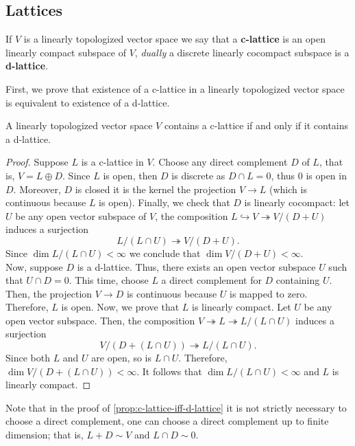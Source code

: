 \subsection*{Lattices}
\begin{definition}\label{def:c-lattice}
	If $V$ is a linearly topologized vector space we say that a \textbf{c-lattice} is an open linearly compact subspace of $V$, \textit{dually} a discrete linearly cocompact subspace is a \textbf{d-lattice}.
\end{definition}
First, we prove that existence of a c-lattice in a linearly topologized vector space is equivalent to existence of a d-lattice.
\begin{proposition}\label{prop:c-lattice-iff-d-lattice}
	A linearly topologized vector space $V$ contains a c-lattice if and only if it contains a d-lattice. 
\end{proposition}
\begin{proof}
	Suppose $L$ is a c-lattice in $V$. Choose any direct complement $D$ of $L$, that is, $V = L \oplus D$. Since $L$ is open, then $D$ is discrete as $D\cap L = 0$, thus ${0}$ is open in $D$. Moreover, $D$ is closed it is the kernel the projection $V \to L$ (which is continuous because $L$ is open). Finally, we check that $D$ is linearly cocompact: let $U$ be any open vector subspace of $V$, the composition $L \hookrightarrow V \twoheadrightarrow V/(D+U)$ induces a surjection 
	\[
		L/(L \cap U) \twoheadrightarrow V/(D+U).
	\]
	Since $\dim L / (L \cap U) < \infty$ we conclude that $\dim V/(D+U) < \infty$. \\
	Now, suppose $D$ is a d-lattice. Thus, there exists an open vector subspace $U$ such that $U \cap D = 0$. This time, choose $L$ a direct complement for $D$ containing $U$. Then, the projection $V \to D$ is continuous because $U$ is mapped to zero. Therefore, $L$ is open. Now, we prove that $L$ is linearly compact. Let $U$ be any open vector subspace. Then, the composition $V \twoheadrightarrow L \twoheadrightarrow L/(L \cap U)$ induces a surjection
	 \[
	 	V/(D + (L \cap U)) \twoheadrightarrow L/(L \cap U).
	 \]
	 Since both $L$ and $U$ are open, so is $L\cap U$. Therefore, $\dim V/(D + (L \cap U)) < \infty$. It follows that $\dim L/(L \cap U) < \infty$ and $L$ is linearly compact.  
\end{proof}
\begin{remark}\label{up-to-finite-dimension}
	Note that in the proof of \cref{prop:c-lattice-iff-d-lattice} it is not strictly necessary to choose a direct complement, one can choose a direct complement up to finite dimension; that is, $L + D \sim V$ and $L \cap D \sim 0$. 
\end{remark}
